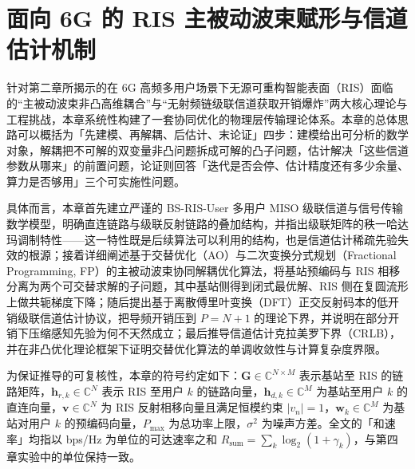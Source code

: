\chapter{面向 6G 的 RIS 主被动波束赋形与信道估计机制}
\label{chap:methodology}

针对第二章所揭示的在 6G 高频多用户场景下无源可重构智能表面（RIS）面临的“主被动波束非凸高维耦合”与“无射频链级联信道获取开销爆炸”两大核心理论与工程挑战，本章系统性构建了一套协同优化的物理层传输理论体系。本章的总体思路可以概括为「先建模、再解耦、后估计、末论证」四步：建模给出可分析的数学对象，解耦把不可解的双变量非凸问题拆成可解的凸子问题，估计解决「这些信道参数从哪来」的前置问题，论证则回答「迭代是否会停、估计精度还有多少余量、算力是否够用」三个可实施性问题。

具体而言，本章首先建立严谨的 BS-RIS-User 多用户 MISO 级联信道与信号传输数学模型，明确直连链路与级联反射链路的叠加结构，并指出级联矩阵的秩一哈达玛调制特性——这一特性既是后续算法可以利用的结构，也是信道估计稀疏先验失效的根源；接着详细阐述基于交替优化（AO）与二次变换分式规划（Fractional Programming, FP）的主被动波束协同解耦优化算法，将基站预编码与 RIS 相移分离为两个可交替求解的子问题，其中基站侧得到闭式最优解、RIS 侧在复圆流形上做共轭梯度下降；随后提出基于离散傅里叶变换（DFT）正交反射码本的低开销级联信道估计协议，把导频开销压到 $P = N+1$ 的理论下界，并说明在部分开销下压缩感知先验为何不天然成立；最后推导信道估计克拉美罗下界（CRLB），并在非凸优化理论框架下证明交替优化算法的单调收敛性与计算复杂度界限。

为保证推导的可复核性，本章的符号约定如下：$\bm{G}\in\mathbb{C}^{N\times M}$ 表示基站至 RIS 的链路矩阵，$\bm{h}_{r,k}\in\mathbb{C}^{N}$ 表示 RIS 至用户 $k$ 的链路向量，$\bm{h}_{d,k}\in\mathbb{C}^{M}$ 为基站至用户 $k$ 的直连向量，$\bm{v}\in\mathbb{C}^{N}$ 为 RIS 反射相移向量且满足恒模约束 $|v_n| = 1$，$\bm{w}_k\in\mathbb{C}^{M}$ 为基站对用户 $k$ 的预编码向量，$P_{\max}$ 为总功率上限，$\sigma^2$ 为噪声方差。全文的「和速率」均指以 bps/Hz 为单位的可达速率之和 $R_{\mathrm{sum}} = \sum_k \log_2(1+\gamma_k)$，与第四章实验中的单位保持一致。







